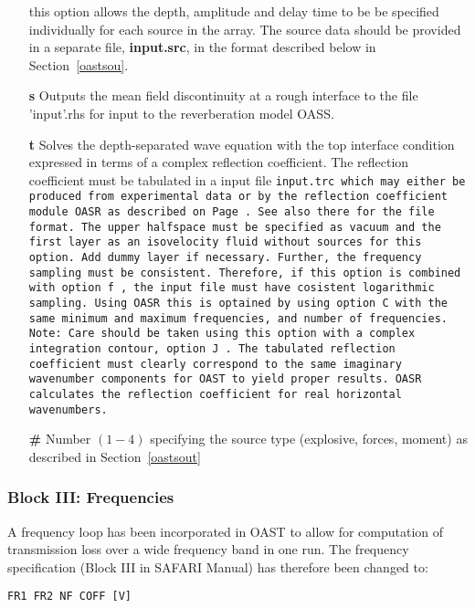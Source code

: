 \begin{itemize}
this option allows the depth, amplitude and  delay time to be be
specified individually for each source in the array. The source data
should be provided in a separate file, {\bf input.src}, in the format
described below in Section~\ref{oastsou}.
    \item[{\bf s}]     Outputs  the  mean  field  discontinuity  at  a   rough 
          interface  to  the file 'input'.rhs for  input  to  the 
          reverberation model OASS.
    \item[{\bf t}] Solves the depth-separated wave equation with the
top  interface condition expressed in terms of a complex
reflection coefficient. The reflection coefficient must be tabulated in a input file \tt input.trc \rm
which may either be produced from experimental data or by the
reflection coefficient module \tt OASR \rm as described on
Page\,\pageref{trc-form}. See also there for the file format.
The upper halfspace must be specified as vacuum and the first layer as
an isovelocity fluid without sources for this option. Add dummy layer
if necessary. Further, the
frequency sampling must be consistent. Therefore, if this option is
combined with option \tt f \rm, the input file must have cosistent logarithmic
sampling. Using \tt OASR \rm this is optained by using option \tt C
\rm with the same minimum and maximum frequencies, and number of frequencies.
Note: Care should be taken using this option with a complex
integration contour, option \tt J \rm. The tabulated reflection
coefficient must clearly correspond to the same imaginary wavenumber
components for \tt OAST \rm to yield proper results. \tt OASR \rm calculates
the reflection coefficient for real horizontal wavenumbers.
    \item[{\bf \#}] Number $(1-4)$ specifying the source type
       (explosive, forces, moment) as described in Section~\ref{oastsout}  
\end{itemize}

\subsubsection{Block III: Frequencies}

A frequency loop has been incorporated in OAST to allow for computation
of transmission loss over a wide frequency band in one run. The frequency
specification (Block III in SAFARI Manual) has therefore been changed to:

\begin{verbatim}
FR1 FR2 NF COFF [V]
\end{verbatim}

